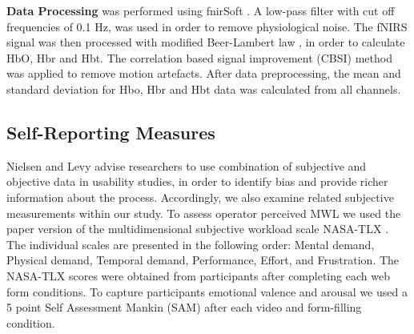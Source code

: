 \documentclass[../main/Feedback.tex]{subfiles}
\begin{document}
\textbf{Data Processing} was performed using fnirSoft \cite{ayazfunctional}.
A low-pass filter with cut off frequencies of 0.1 Hz, was used in order to remove physiological noise.
The fNIRS signal was then processed with modified Beer-Lambert law \cite{cope1988system}, in order to calculate HbO, Hbr and Hbt.
The correlation based signal improvement (CBSI) \cite{cui2010functional} method was applied to remove motion artefacts.
After data preprocessing, the mean and standard deviation for Hbo, Hbr and Hbt data was calculated from all channels.


\subsection{Self-Reporting Measures}
Nielsen and Levy \cite{nielsen1994measuring} advise researchers to use combination of subjective and objective data in usability studies, in order to identify bias and provide richer information about the process. Accordingly, we also examine related subjective measurements within our study. To assess operator perceived MWL we used the paper version of the multidimensional subjective workload scale NASA-TLX \cite{nasatlx}.
The individual scales are presented in the following order: Mental demand, Physical demand, Temporal demand, Performance, Effort, and Frustration.
The NASA-TLX scores were obtained from participants after completing each web form conditions. To capture participants emotional valence and arousal we used a 5 point Self Assessment Mankin (SAM) \cite{bradley1994measuring} after each video and form-filling condition.
\end{document}
